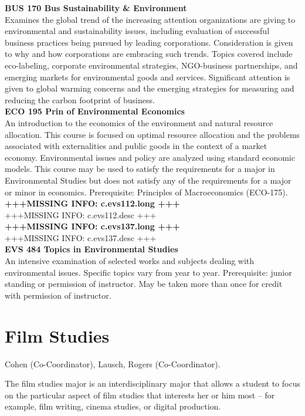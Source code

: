 \documentclass[
  letterpaper,
]{scrbook}
\begin{document}
\textbf{BUS 170 Bus Sustainability \& Environment}\\
Examines the global trend of the increasing attention organizations are
giving to environmental and sustainability issues, including evaluation
of successful business practices being pursued by leading corporations.
Consideration is given to why and how corporations are embracing such
trends. Topics covered include eco-labeling, corporate environmental
strategies, NGO-business partnerships, and emerging markets for
environmental goods and services. Significant attention is given to
global warming concerns and the emerging strategies for measuring and
reducing the carbon footprint of business.\\
\textbf{ECO 195 Prin of Environmental Economics}\\
An introduction to the economics of the environment and natural resource
allocation. This course is focused on optimal resource allocation and
the problems associated with externalities and public goods in the
context of a market economy. Environmental issues and policy are
analyzed using standard economic models. This course may be used to
satisfy the requirements for a major in Environmental Studies but does
not satisfy any of the requirements for a major or minor in economics.
Prerequisite: Principles of Macroeconomics (ECO-175).\\
\textbf{+++MISSING INFO: c.evs112.long +++}\\
+++MISSING INFO: c.evs112.desc +++\\
\textbf{+++MISSING INFO: c.evs137.long +++}\\
+++MISSING INFO: c.evs137.desc +++\\
\textbf{EVS 484 Topics in Environmental Studies}\\
An intensive examination of selected works and subjects dealing with
environmental issues. Specific topics vary from year to year.
Prerequisite: junior standing or permission of instructor. May be taken
more than once for credit with permission of instructor.

\section{Film Studies}\label{sec-film-studies}

Cohen (Co-Coordinator), Lausch, Rogers (Co-Coordinator).

The film studies major is an interdisciplinary major that allows a
student to focus on the particular aspect of film studies that interests
her or him most -- for example, film writing, cinema studies, or digital
production.
\end{document}
